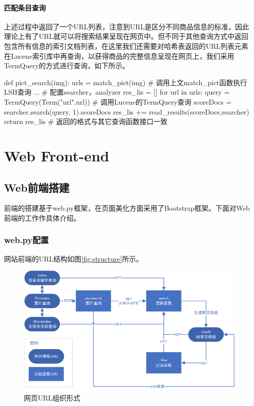 \subsection{匹配条目查询}

上述过程中返回了一个URL列表，注意到URL是区分不同商品信息的标准，因此理论上有了URL就可以将搜索结果呈现在网页中。但不同于其他查询方式中返回包含所有信息的索引文档列表，在这里我们还需要对哈希表返回的URL列表元素在Lucene索引库中再查询，以获得商品的完整信息呈现在网页上，我们采用TermQuery的方式进行查询，如下所示。

\begin{python}
def pict_search(img):
    urls = match_pict(img)             # 调用上文match_pict函数执行LSH查询
    ... # 配置searcher，analyzer
    res_lis = []
    for url in urls:
        query = TermQuery(Term("url",url))   # 调用Lucene的TermQuery查询
        scoreDocs = searcher.search(query, 1).scoreDocs
        res_lis += read_results(scoreDocs,searcher)
    return res_lis                     # 返回的格式与其它查询函数接口一致
\end{python}


\part{Web Front-end}

\chapter{Web前端搭建}

前端的搭建基于web.py框架，在页面美化方面采用了Bootstrap框架。下面对Web前端的工作作具体介绍。

\section{web.py配置}

网站前端的URL结构如图\ref{fig:structure}所示。

\begin{figure}[htbp]
\centering
\includegraphics[width=13.5cm]{img/zlt/url.png}
\caption{网页URL组织形式}
\label{fig:zlt_url}
\end{figure}

